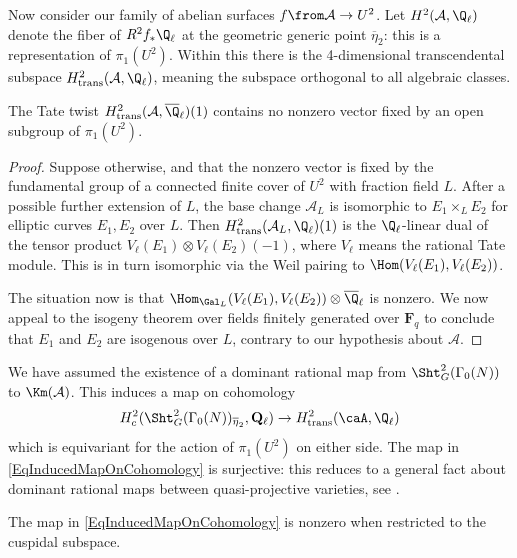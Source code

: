 \documentclass{article}
\def\F{\mathbf{F}}
\begin{document}
Now consider our family of abelian surfaces $f\from \mathcal{A}\to U^2$.  Let $H^2(\mathcal{A},\Q_\ell)$ denote the fiber of $R^2f_*\Q_\ell$ at the geometric generic point $\overline{\eta}_2$:  this is a representation of $\pi_1(U^2)$.  Within this there is the 4-dimensional transcendental subspace $H^2_{\text{trans}}(\mathcal{A},\Q_\ell)$, meaning the subspace orthogonal to all algebraic classes.  


\begin{lemma} \label{LemmaNoFixedVector} The Tate twist $H^2_{\text{trans}}(\mathcal{A},\overline{\Q}_\ell)(1)$ contains no nonzero vector fixed by an open subgroup of $\pi_1(U^2)$.  
\end{lemma}

\begin{proof} Suppose otherwise, and that the nonzero vector is fixed by the fundamental group of a connected finite cover of $U^2$ with fraction field $L$.  After a possible further extension of $L$, the base change $\mathcal{A}_L$ is isomorphic to $E_1\times_L E_2$ for elliptic curves $E_1,E_2$ over $L$.  Then $H^2_{\text{trans}}(\mathcal{A}_L,\Q_\ell)(1)$ is the $\Q_\ell$-linear dual of the tensor product $V_\ell(E_1)\otimes V_\ell(E_2)(-1)$, where $V_\ell$ means the rational Tate module.  This is  in turn isomorphic via the Weil pairing to $\Hom(V_\ell(E_1),V_\ell(E_2))$.  

The situation now is that $\Hom_{\Gal_L}(V_\ell(E_1),V_\ell(E_2))\otimes\overline{\Q}_\ell$ is nonzero.  We now appeal to the isogeny theorem over fields finitely generated over $\F_q$ \cite[Theorem 1.4]{Zarhin} to conclude that $E_1$ and $E_2$ are isogenous over $L$, contrary to our hypothesis about $\mathcal{A}$.
\end{proof}

We have assumed the existence of a dominant rational map from $\Sht_G^2(\Gamma_0(N))$ to $\Km(\mathcal{A})$.  This induces a
map on cohomology
\begin{equation}
\label{EqInducedMapOnCohomology}
{H^2_c(\Sht_G^2(\Gamma_0(N))_{\overline{\eta}_2}, {\mathbf{Q}}_\ell)} 
%
\to {H^2_{\text{trans}}({{\caA}},
\Q_\ell)}
\end{equation}
which is equivariant for the action of $\pi_1(U^2)$ on either side.   The map in \eqref{EqInducedMapOnCohomology} is surjective:  this reduces to a general fact about dominant rational maps between quasi-projective varieties, see \cite[Proposition 1.2.4]{Kleiman}.


\begin{lemma} The map in \eqref{EqInducedMapOnCohomology} is nonzero when restricted to the cuspidal subspace.
\end{lemma}
\end{document}
